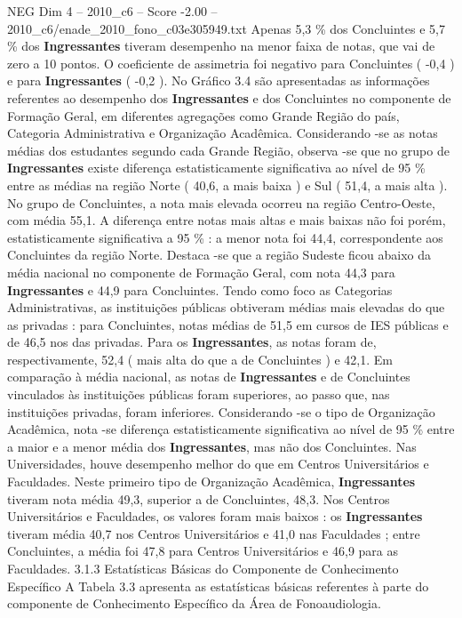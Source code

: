 \begin{textsample}{NEG Dim 4 – 2010\_c6 – Score -2.00 – 2010\_c6/enade\_2010\_fono\_c03e305949.txt}
Apenas 5,3 \% dos Concluintes e 5,7 \% dos \textbf{Ingressantes} tiveram desempenho na menor faixa de notas, que vai de zero a 10 pontos.
O coeficiente de assimetria foi negativo para Concluintes ( -0,4 ) e para \textbf{Ingressantes} ( -0,2 ).
No Gráfico 3.4 são apresentadas as informações referentes ao desempenho dos \textbf{Ingressantes} e dos Concluintes no componente de Formação Geral, em diferentes agregações como Grande Região do país, Categoria Administrativa e Organização Acadêmica.
Considerando -se as notas médias dos estudantes segundo cada Grande Região, observa -se que no grupo de \textbf{Ingressantes} existe diferença estatisticamente significativa ao nível de 95 \% entre as médias na região Norte ( 40,6, a mais baixa ) e Sul ( 51,4, a mais alta ).
No grupo de Concluintes, a nota mais elevada ocorreu na região Centro-Oeste, com média 55,1.
A diferença entre notas mais altas e mais baixas não foi porém, estatisticamente significativa a 95 \% : a menor nota foi 44,4, correspondente aos Concluintes da região Norte.
Destaca -se que a região Sudeste ficou abaixo da média nacional no componente de Formação Geral, com nota 44,3 para \textbf{Ingressantes} e 44,9 para Concluintes.
Tendo como foco as Categorias Administrativas, as instituições públicas obtiveram médias mais elevadas do que as privadas : para Concluintes, notas médias de 51,5 em cursos de IES públicas e de 46,5 nos das privadas.
Para os \textbf{Ingressantes}, as notas foram de, respectivamente, 52,4 ( mais alta do que a de Concluintes ) e 42,1.
Em comparação à média nacional, as notas de \textbf{Ingressantes} e de Concluintes vinculados às instituições públicas foram superiores, ao passo que, nas instituições privadas, foram inferiores.
Considerando -se o tipo de Organização Acadêmica, nota -se diferença estatisticamente significativa ao nível de 95 \% entre a maior e a menor média dos \textbf{Ingressantes}, mas não dos Concluintes.
Nas Universidades, houve desempenho melhor do que em Centros Universitários e Faculdades.
Neste primeiro tipo de Organização Acadêmica, \textbf{Ingressantes} tiveram nota média 49,3, superior a de Concluintes, 48,3.
Nos Centros Universitários e Faculdades, os valores foram mais baixos : os \textbf{Ingressantes} tiveram média 40,7 nos Centros Universitários e 41,0 nas Faculdades ; entre Concluintes, a média foi 47,8 para Centros Universitários e 46,9 para as Faculdades. 3.1.3 Estatísticas Básicas do Componente de Conhecimento Específico A Tabela 3.3 apresenta as estatísticas básicas referentes à parte do componente de Conhecimento Específico da Área de Fonoaudiologia.

\end{textsample}
